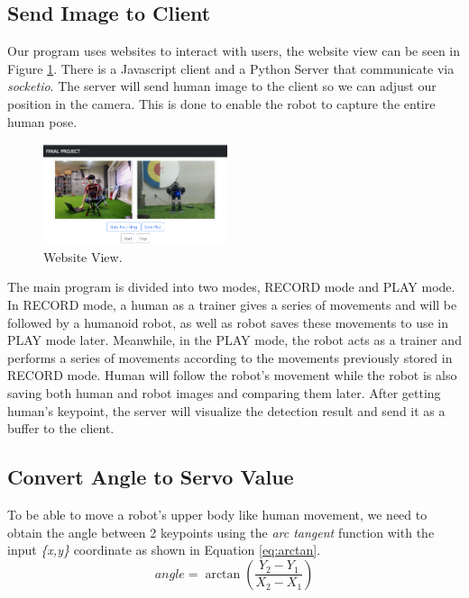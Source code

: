\subsection{Send Image to Client}
\label{subsec:send-image-to-client}

Our program uses websites to interact with users, the website view can be seen in Figure \ref{fig:websiteview}. There is a Javascript client and a Python Server that communicate via \emph{socketio}.
The server will send human image to the client so we can adjust our position in the camera. This is done to enable the robot to capture the entire human pose.
\begin{figure}[ht]
  \centering
  \includegraphics[width=0.48\textwidth]{gambar/web.png}
  \caption{Website View.}
  \label{fig:websiteview}
\end{figure}
The main program is divided into two modes, RECORD mode and PLAY mode. In RECORD mode, a human as a trainer gives a series of movements and will be followed by a humanoid robot, as well as robot saves these movements to use in PLAY mode later.
Meanwhile, in the PLAY mode, the robot acts as a trainer and performs a series of movements according to the movements previously stored in RECORD mode. Human will follow the robot's movement while the robot is also saving both human and robot images and comparing them later. After getting human's keypoint, the server will visualize the detection result and send it as a buffer to the client.


\subsection{Convert Angle to Servo Value}
\label{subsec:convert-angle-to-servo-value}

To be able to move a robot's upper body like human movement, we need to obtain the angle between 2 keypoints using the \emph{arc tangent} function with the input \emph{\{x,y\}} coordinate as shown in Equation \ref{eq:arctan}.
\begin{equation}
  \label{eq:arctan}
  angle = \arctan \left(\frac{Y_2 - Y_1}{X_2 - X_1}\right)
\end{equation}


